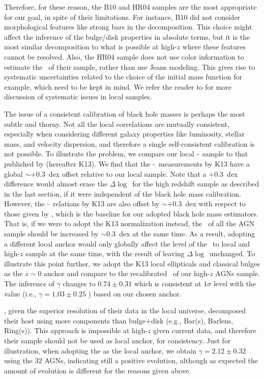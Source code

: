 \documentclass[apj]{emulateapj}
\begin{document}
Therefore, for these reason, the B10 and HR04 samples are the most appropriate for our goal, in spite of their limitations. For instance, B10 did not consider morphological features like strong bars in the decomposition. This choice might affect the inference of the bulge/disk properties in absolute terms, but it is the most similar decomposition to what is possible at high-$z$ where these features cannot be resolved. Also, the HR04 sample does not use color information to estimate the \smass~of their sample, rather than use Jeans modeling. This gives rise to systematic uncertainties related to the choice of the initial mass function for example, which need to be kept in mind. We refer the reader to \citet{Kormendy13} for more discussion of systematic issues in local samples.

The issue of a consistent calibration of black hole masses is perhaps the most subtle and thorny.
Not all the local correlations are mutually consistent, especially when considering different galaxy properties like luminosity, stellar mass, and velocity dispersion, and therefore a single self-consistent calibration is not possible. To illustrate the problem, we compare our local \mbh-\smass\ sample to that published by \citet{Kormendy13} (hereafter K13). We find that the \mbh-\smass\ measurements by K13 have a global $\sim+0.3$~dex offset relative to our local sample. Note that a $+0.3$~dex difference would almost erase the $\Delta\log$\mbh\ for the high redshift sample as described in the last section, if it were independent of the black hole mass calibration. However, the \mbh-\sigstar\ relations by K13 are also offset by  $\sim+0.3$~dex with respect to those given by \citet{Woo2010}, which is the baseline for our adopted black hole mass estimators. That is, if we were to adopt the K13 normalization instead, the \mbh\ of all the AGN sample should be increased by $\sim$0.3~dex at the same time. As a result, adopting a different local anchor would only globally affect the level of the \mbh\ to local and high-$z$ sample at the same time, with the result of leaving $\Delta\log$\mbh\ unchanged. To illustrate this point further, we adopt the K13 local ellipticals and classical bulges as the $z\sim0$ anchor and compare to the recalibrated \mbh\ of our high-$z$ AGNs sample. The inference of  $\gamma$ changes to $0.74\pm0.31$ which is consistent at $1\sigma$ level with the value (i.e., $\gamma=1.03\pm0.25$ ) based on our chosen anchor.

\citet{Bentz2018}, given the superior resolution of their data in the local universe, decomposed their host using more components than bulge$+$disk (e.g., Bar(s), Barlens, Ring(s)). This approach is impossible at high-$z$ given current data, and therefore their sample should not be used as local anchor, for consistency.
Just for illustration, when adopting the \citet{Bentz2018} as the local anchor, we obtain $\gamma = 2.12\pm 0.32$ using the 32 AGNs, indicating still a positive evolution, although as expected the amount of evolution is different for the reasons given above.
\end{document}
